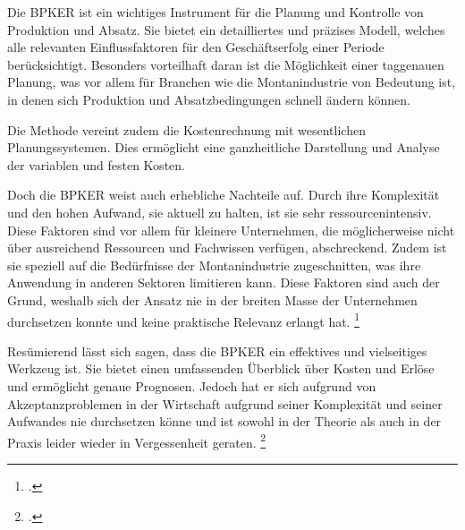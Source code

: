 

Die BPKER ist ein wichtiges Instrument für die Planung und Kontrolle von Produktion und Absatz. Sie bietet ein detailliertes und präzises Modell, welches alle relevanten Einflussfaktoren für den Geschäftserfolg einer Periode berücksichtigt. Besonders vorteilhaft daran ist die Möglichkeit einer taggenauen Planung, was vor allem für Branchen wie die Montanindustrie von Bedeutung ist, in denen sich Produktion und Absatzbedingungen schnell ändern können.

Die Methode vereint zudem die Kostenrechnung mit wesentlichen Planungssystemen. Dies ermöglicht eine ganzheitliche Darstellung und Analyse der variablen und festen Kosten.

Doch die BPKER weist auch erhebliche Nachteile auf. Durch ihre Komplexität und den hohen Aufwand, sie aktuell zu halten, ist sie sehr ressourcenintensiv. Diese Faktoren sind vor allem für kleinere Unternehmen, die möglicherweise nicht über ausreichend Ressourcen und Fachwissen verfügen, abschreckend. Zudem ist sie speziell auf die Bedürfnisse der Montanindustrie zugeschnitten, was ihre Anwendung in anderen Sektoren limitieren kann. Diese Faktoren sind auch der Grund, weshalb sich der Ansatz nie in der breiten Masse der Unternehmen durchsetzen konnte und keine praktische Relevanz erlangt hat. \footcite[Vgl.][(S. 292ff)]{franz2001beitrag}

Resümierend lässt sich sagen, dass die BPKER ein effektives und vielseitiges Werkzeug ist. Sie bietet einen umfassenden Überblick über Kosten und Erlöse und ermöglicht genaue Prognosen. Jedoch hat er sich aufgrund von Akzeptanzproblemen in der Wirtschaft aufgrund seiner Komplexität und seiner Aufwandes nie durchsetzen könne und ist sowohl in der Theorie als auch in der Praxis leider wieder in Vergessenheit geraten. \footcite[Vgl.][(S. 292ff)]{franz2001beitrag}

